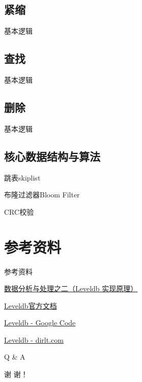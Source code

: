 \documentclass[CJK]{beamer}
\begin{document}
\begin{CJK*}{UTF8}{gkai}
\subsection{紧缩}
\begin{frame}{基本逻辑}
\end{frame}

\subsection{查找}
\begin{frame}{基本逻辑}
\end{frame}

\subsection{删除}
\begin{frame}{基本逻辑}
\end{frame}

\subsection{核心数据结构与算法}
\begin{frame}{跳表skiplist}
\end{frame}

\begin{frame}{布隆过滤器Bloom Filter}
\end{frame}

\begin{frame}{CRC校验}
\end{frame}

\section{参考资料}
\begin{frame}{参考资料}
\begin{itemize}
{\color{blue}
\item \href{http://www.cnblogs.com/haippy/archive/2011/12/04/2276064.html}{数据分析与处理之二（Leveldb 实现原理）}
\item \href{http://leveldb.googlecode.com/svn/trunk/doc/index.html}{Leveldb官方文档}
\item \href{https://code.google.com/p/leveldb/}{Leveldb - Google Code}
\item \href{http://dirlt.com/leveldb.html}{Leveldb - dirlt.com}
}
\end{itemize}
\end{frame}

\begin{frame}{Q \& A}
\begin{center}
谢 谢！
\end{center}
\end{frame}
\end{CJK*}
\end{document}
